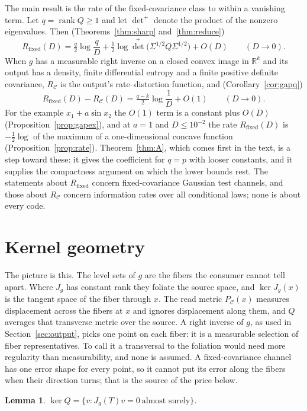 \documentclass[11pt,onecolumn]{IEEEtran}
\newtheorem{lemma}[theorem]{Lemma}
\newcommand{\R}{\mathbb{R}}
\newcommand{\PC}{P_{\mathcal C}}
\newcommand{\Rfix}{R_{\mathrm{fixed}}}
\newcommand{\RC}{R_{\mathcal C}}
\begin{document}
The main result is the rate of the fixed-covariance class to within a vanishing term. Let
$q=\operatorname{rank}Q\ge1$ and let ${\det}^{+}$ denote the product of the nonzero
eigenvalues. Then (Theorems~\ref{thm:sharp} and~\ref{thm:reduce})
\[
\Rfix(D)=\tfrac q2\log\frac qD+\tfrac12\log{\det}^{+}\bigl(\Sigma^{1/2}Q\Sigma^{1/2}\bigr)
+O(D)\qquad(D\to0).
\]
When $g$ has a measurable right inverse on a closed convex image in $\R^k$ and its output
has a density, finite differential entropy and a finite positive definite covariance,
$\RC$ is the output's rate--distortion function, and (Corollary~\ref{cor:gapq})
\[
\Rfix(D)-\RC(D)=\tfrac{q-k}2\log\frac1D+O(1)\qquad(D\to0).
\]
For the example $x_1+a\sin x_2$ the $O(1)$ term is a constant plus $O(D)$
(Proposition~\ref{prop:gapex}), and at $a=1$ and $D\le10^{-2}$ the rate $\Rfix(D)$ is $-\tfrac12\log$ of the maximum
of a one-dimensional concave function (Proposition~\ref{prop:rate}). Theorem~\ref{thm:A}, which comes first in the text, is a
step toward these: it gives the coefficient for $q=p$ with looser constants, and it
supplies the compactness argument on which the lower bounds rest. The statements
about $\Rfix$ concern fixed-covariance Gaussian test channels, and those about $\RC$
concern information rates over all conditional laws; none is about every code.

\section{Kernel geometry}

The picture is this. The level sets of $g$ are the fibers the consumer cannot tell apart.
Where $J_g$ has constant rank they foliate the source space, and $\ker J_g(x)$ is the
tangent space of the fiber through $x$. The read metric $\PC(x)$ measures displacement
across the fibers at $x$ and ignores displacement along them, and $Q$ averages that
transverse metric over the source. A right inverse of $g$, as used in
Section~\ref{sec:output}, picks one point on each fiber: it is a measurable selection of
fiber representatives. To call it a transversal to the foliation would need more
regularity than measurability, and none is assumed. A fixed-covariance channel has one error shape for every point, so it cannot
put its error along the fibers when their direction turns; that is the source of the
price below.

\begin{lemma}\label{lem:kernel}
$\ker Q=\{v:J_g(T)v=0\ \text{almost surely}\}$.
\end{lemma}
\end{document}
